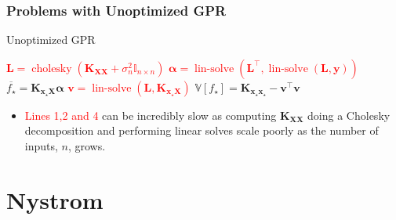 \documentclass[9pt,hyperref={pdfpagelabels=false},xcolor=table]{beamer}
\begin{document}
\begin{frame}
    \frametitle{Problems with Unoptimized GPR}
    {\centering
        \begin{minipage}{.9\linewidth}
            \begin{algorithm}[H]
                \caption{Unoptimized GPR}
                \SetAlgoLined
                \DontPrintSemicolon

                \BlankLine
                \textcolor{red}{$\bm{L} = \operatorname{cholesky} \left( \bm{K_{XX}} + \sigma_n^2 \mathbb{I}_{n \times n} \right)$}\;
                \textcolor{red}{$\bm{\alpha} = \operatorname{lin-solve} \left( \bm{L}^{\intercal} , \operatorname{lin-solve} \left( \bm{L}, \bm{y} \right) \right)$}\;
                $\overline{f_{\star}} = \bm{K_{x_{\star} X}} \bm{\alpha}$\;
                \textcolor{red}{$\bm{v} = \operatorname{lin-solve} \left( \bm{L}, \bm{K_{x_{\star} X}} \right)$}\;
                $\mathbb{V} \left[ f_{\star} \right] = \bm{K_{x_{\star} x_{\star}}} - \bm{v}^{\intercal} \bm{v}$\;
                \BlankLine
            \end{algorithm}
        \end{minipage}
        \par
    }
    \begin{itemize}
        \item \textcolor{red}{Lines 1,2 and 4} can be incredibly slow as computing $\bm{K_{XX}}$ doing a Cholesky decomposition and performing linear solves scale poorly as the number of inputs, $n$, grows.
    \end{itemize}
\end{frame}

\section{Nystrom}
\end{document}
